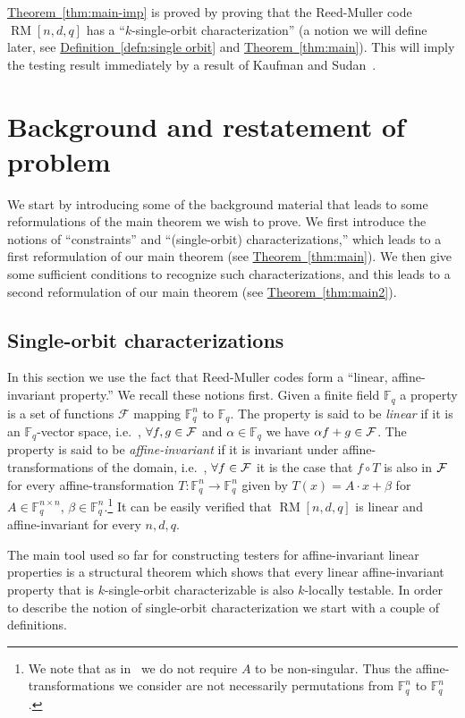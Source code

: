 \documentclass[10pt]{article}
\theoremstyle{definition}
\providecommand{\ie}{i.e.\ }
\numberwithin{equation}{section}
\newcommand{\expref}[2]{\texorpdfstring{\hyperref[#2]{#1~\ref{#2}}}{#1~\ref{#2}}}
\newcommand{\calf}{{\cal F}}
\newcommand{\F}{{\mathbb{F}}}
\newcommand{\cF}{{\mathcal{F}}}
\newcommand{\mrm}{\mathop{\mathrm{RM}}}
\begin{document}
\expref{Theorem}{thm:main-imp} is proved by proving that the
Reed-Muller code $\mrm[n,d,q]$ has a ``$k$-single-orbit characterization''
(a notion we will define later, see \expref{Definition}{defn:single orbit} and
\expref{Theorem}{thm:main}). This will imply the testing result
immediately by a result of Kaufman and Sudan~\cite{KS08}.
\setcounter{section}{1}
\section{Background and restatement of problem}
\label{sec:restate}

We start by introducing some of the background
material that leads to some reformulations of the
main theorem we wish to prove. We first introduce
the notions of ``constraints'' and ``(single-orbit)
characterizations,'' which leads to a first reformulation
of our main theorem (see \expref{Theorem}{thm:main}).
We then give some sufficient
conditions to recognize such characterizations,
and this leads to a second reformulation of our
main theorem (see \expref{Theorem}{thm:main2}).


\subsection{Single-orbit characterizations}

In this section we use the fact that Reed-Muller codes
form a ``linear, affine-invariant property.'' We recall
these notions first.
Given a finite field $\F_q$ a
property is a set of functions $\cF$ mapping $\F_{q}^n$ to $\F_q$.
The property is said to
be
\emph{linear} if
it is an $\F_q$-vector space, \ie, $\forall f,g \in \calf$
and $\alpha \in \F_q$ we have $\alpha f + g \in \calf$.
The property is said to be \emph{affine-invariant} if it is invariant under
affine-transformations of the domain, \ie,
$\forall f \in \calf$ it is the case that $f \circ T$ is also
in $\calf$ for every affine-transformation $T: \F_q^n \to \F_q^n$ given by $T(x) = A \cdot x + \beta$ for $A \in \F_q^{n \times n}$, $\beta \in \F_q^n$.\footnote{We note that as in~\cite{KS08} we do not require $A$ to be
non-singular. Thus the affine-transformations we consider are not
necessarily permutations from $\F_q^n$ to $\F_q^n$.}
It can be easily verified that $\mrm[n,d,q]$ is linear and affine-invariant
for every $n, d, q$.

The main tool used so far for constructing testers for affine-invariant linear properties is a
 structural theorem which shows that every linear affine-invariant property that is $k$-single-orbit characterizable
 is also $k$-locally testable.
 In order to describe the notion of single-orbit characterization we start with a couple of definitions.
\end{document}
